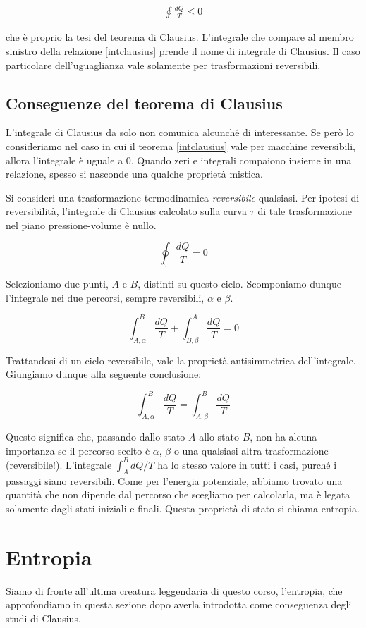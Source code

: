 \begin{align}
    \oint \frac{dQ}{T} \leq 0\label{intclausius}
\end{align}

\noindent che è proprio la tesi del teorema di Clausius. L'integrale
che compare al membro sinistro della relazione \ref{intclausius}
prende il nome di integrale di Clausius. Il caso particolare
dell'uguaglianza vale solamente per trasformazioni reversibili.

\subsection{Conseguenze del teorema di Clausius}
L'integrale di Clausius da solo non comunica alcunché di interessante.
Se però lo consideriamo nel caso in cui il teorema \ref{intclausius}
vale per macchine reversibili, allora l'integrale è uguale a 0. Quando
zeri e integrali compaiono insieme in una relazione, spesso si
nasconde una qualche proprietà mistica.

Si consideri una trasformazione termodinamica \textit{reversibile} qualsiasi.
Per ipotesi di reversibilità, l'integrale di Clausius calcolato sulla curva $\tau$
di tale trasformazione nel piano pressione-volume è nullo.

\[ \oint_\tau \frac{dQ}{T} = 0 \]

\noindent Selezioniamo due punti, $A$ e $B$, distinti su questo ciclo. Scomponiamo
dunque l'integrale nei due percorsi, sempre reversibili, $\alpha$ e $\beta$.

\[ \int_{A,\alpha}^{B} \frac{dQ}{T} + \int_{B,\beta}^{A} \frac{dQ}{T} = 0 \]

\noindent Trattandosi di un ciclo reversibile, vale la proprietà antisimmetrica
dell'integrale. Giungiamo dunque alla seguente conclusione:

\[ \int_{A,\alpha}^{B} \frac{dQ}{T} = \int_{A,\beta}^{B} \frac{dQ}{T} \]

\noindent Questo significa che, passando dallo stato $A$ allo stato
$B$, non ha alcuna importanza se il percorso scelto è $\alpha$, $\beta$
o una qualsiasi altra trasformazione (reversibile!). L'integrale
$\int_{A}^{B}dQ/T$ ha lo stesso valore in tutti i casi, purché i
passaggi siano reversibili. Come per l'energia potenziale,
abbiamo trovato una quantità che non dipende dal percorso che
scegliamo per calcolarla, ma è legata solamente dagli stati
iniziali e finali. Questa proprietà di stato si chiama entropia.

\section{Entropia}
Siamo di fronte all'ultima creatura leggendaria di questo corso,
l'entropia, che approfondiamo in questa sezione dopo averla introdotta
come conseguenza degli studi di Clausius.

